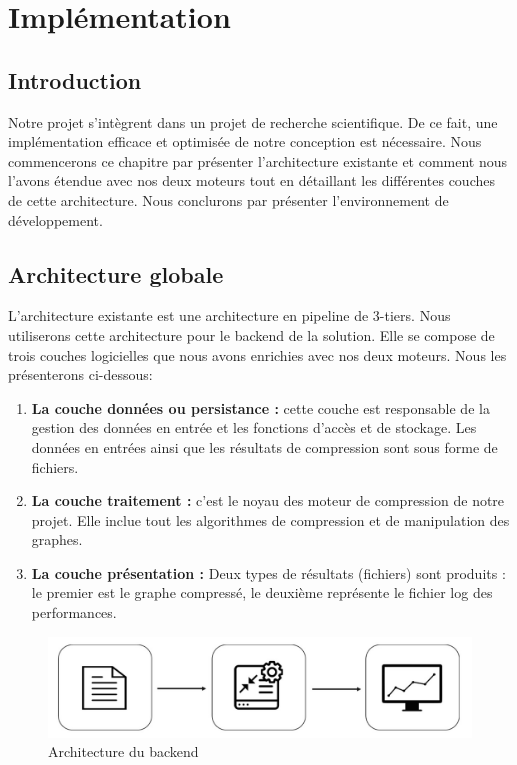 \chapter{Implémentation}
	\section{Introduction}
	
	Notre projet s'intègrent dans un projet de recherche scientifique. De ce fait, une implémentation efficace et optimisée de notre conception est nécessaire. Nous commencerons ce chapitre par présenter l'architecture existante et comment nous l'avons étendue avec nos deux moteurs tout en détaillant les différentes couches de cette architecture. Nous conclurons par présenter l'environnement de développement.
	
	
	\section{Architecture globale}
	
	L'architecture existante est une architecture en pipeline de 3-tiers. Nous utiliserons cette architecture pour le backend de la solution. Elle se compose de trois couches logicielles que nous avons enrichies avec nos deux moteurs. Nous les présenterons ci-dessous:
	
	\begin{enumerate}
	\item \textbf{La couche données ou persistance :} cette couche est responsable de la gestion des données en entrée et les fonctions d'accès et de stockage. Les données en entrées ainsi que les résultats de compression sont sous forme de fichiers.
	
	\item \textbf{La couche traitement :} c'est le noyau des moteur de compression de notre projet. Elle inclue tout les algorithmes de compression et de manipulation des graphes. 
	
	\item \textbf{La couche présentation :}  Deux types de résultats (fichiers) sont produits : le premier est le graphe compressé, le deuxième représente le fichier log des performances. 
	\end{enumerate}
		
	
\begin{figure}[H]
	\centering
	\label{Img:archglob}
	\includegraphics[scale=0.35]{ressources/image/ArchGlob.jpg}
	\caption{Architecture du backend}

 \end{figure}
	
